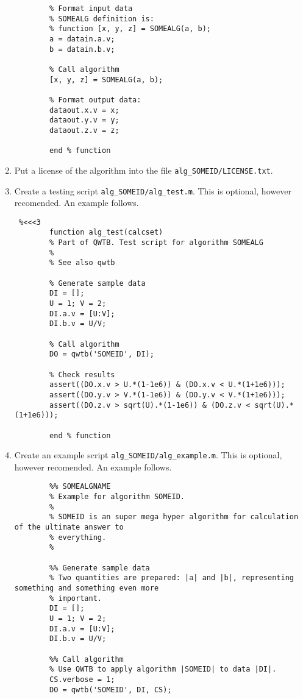 \documentclass[12pt,a4paper,oneside]{report} %
\begin{document}
\begin{enumerate}
\begin{lstlisting}
        % Format input data
        % SOMEALG definition is:
        % function [x, y, z] = SOMEALG(a, b);
        a = datain.a.v;
        b = datain.b.v;

        % Call algorithm
        [x, y, z] = SOMEALG(a, b);

        % Format output data:
        dataout.x.v = x;
        dataout.y.v = y;
        dataout.z.v = z;

        end % function
        \end{lstlisting} %

        \item Put a license of the algorithm into the file {\tt alg\_SOMEID/LICENSE.txt}.

        \item Create a testing script {\tt alg\_SOMEID/alg\_test.m}. This is optional, however
        recomended. An example follows.
        \begin{lstlisting} %<<<3
        function alg_test(calcset)
        % Part of QWTB. Test script for algorithm SOMEALG
        %
        % See also qwtb

        % Generate sample data 
        DI = [];
        U = 1; V = 2;
        DI.a.v = [U:V];
        DI.b.v = U/V;

        % Call algorithm
        DO = qwtb('SOMEID', DI);

        % Check results 
        assert((DO.x.v > U.*(1-1e6)) & (DO.x.v < U.*(1+1e6)));
        assert((DO.y.v > V.*(1-1e6)) & (DO.y.v < V.*(1+1e6)));
        assert((DO.z.v > sqrt(U).*(1-1e6)) & (DO.z.v < sqrt(U).*(1+1e6)));

        end % function
        \end{lstlisting}

        \item Create an example script {\tt alg\_SOMEID/alg\_example.m}. This is optional, however
        recomended. An example follows.
        \begin{lstlisting}
        %% SOMEALGNAME
        % Example for algorithm SOMEID.
        %
        % SOMEID is an super mega hyper algorithm for calculation of the ultimate answer to
        % everything.
        %

        %% Generate sample data
        % Two quantities are prepared: |a| and |b|, representing something and something even more
        % important.
        DI = [];
        U = 1; V = 2;
        DI.a.v = [U:V];
        DI.b.v = U/V;

        %% Call algorithm
        % Use QWTB to apply algorithm |SOMEID| to data |DI|.
        CS.verbose = 1;
        DO = qwtb('SOMEID', DI, CS);


\end{lstlisting}
\end{enumerate}
\end{document}
